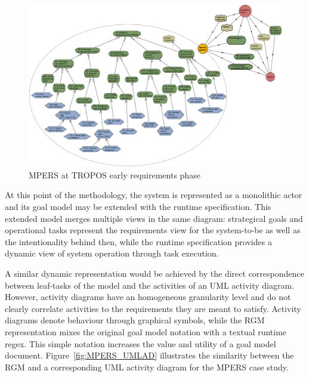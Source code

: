 \begin{figure}[h!]
\centering
\includegraphics[width=1\textwidth]{imgs/MPERS_LR.png}
\caption{MPERS at TROPOS early requirements phase}
\label{fig:MPERS_LR}
\end{figure}

At this point of the methodology, the system is represented as a monolithic actor and its goal model may be extended with the runtime specification. This extended model merges multiple views in the same diagram: strategical goals and operational tasks represent the requirements view for the system-to-be as well as the intentionality behind then, while the runtime specification provides a dynamic view of system operation through task execution.

A similar dynamic representation would be achieved by the direct correspondence between leaf-tasks of the model and the activities of an UML activity diagram. However, activity diagrams have an homogeneous granularity level and do not clearly correlate activities to the requirements they are meant to satisfy. Activity diagrams denote behaviour through graphical symbols, while the RGM representation mixes the original goal model notation with a textual runtime regex. This simple notation increases the value and utility of a goal model document. Figure~\ref{fig:MPERS_UMLAD} illustrates the similarity between the RGM and a corresponding UML activity diagram for the MPERS case study. 

